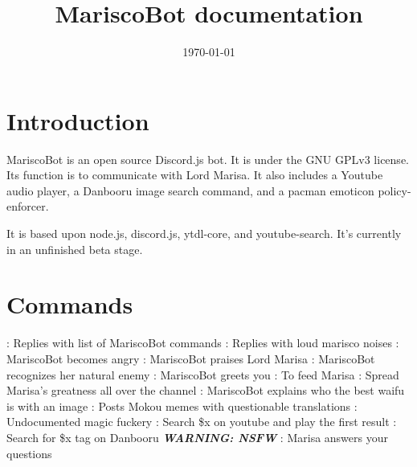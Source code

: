 \documentclass{article}
\begin{document}
\title{MariscoBot documentation}
\date{\today{}}
\maketitle{}
\tableofcontents
\newpage
\section{Introduction}
MariscoBot is an open source Discord.js bot. It is under the GNU GPLv3 license. Its function is to communicate with Lord Marisa. It also includes a Youtube audio player, a Danbooru image search command, and a pacman emoticon policy-enforcer.\

It is based upon node.js, discord.js, ytdl-core, and youtube-search. It's currently in an unfinished beta stage.\

\section{Commands}
\begin{flushleft}
\noindent{} : Replies with list of MariscoBot commands\newline
\noindent{} : Replies with loud marisco noises\newline
\noindent{} : MariscoBot becomes angry\newline
\noindent{} : MariscoBot praises Lord Marisa\newline
\noindent{} : MariscoBot recognizes her natural enemy\newline
\noindent{} : MariscoBot greets you\newline
\noindent{} : To feed Marisa\newline
\noindent{} : Spread Marisa's greatness all over the channel\newline
\noindent{} : MariscoBot explains who the best waifu is with an image\newline
\noindent{} : Posts Mokou memes with questionable translations\newline
\noindent{} : Undocumented magic fuckery\newline
\noindent{} : Search \$x on youtube and play the first result\newline
\noindent{} : Search for \$x tag on Danbooru \textbf{\emph{WARNING: NSFW}}\newline
\noindent{} : Marisa answers your questions\par
\end{flushleft}
\end{document}
